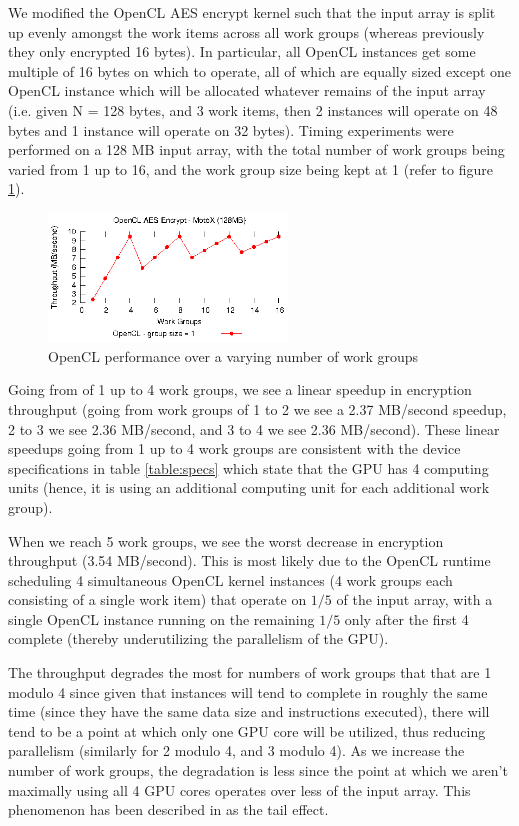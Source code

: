 \documentclass[conference,10pt]{IEEEtran}
\begin{document}
We modified the OpenCL AES encrypt kernel such that the input array is split up evenly amongst the 
work items across all work groups (whereas previously they only encrypted 16 bytes). In particular, 
all OpenCL instances get some multiple of 16 bytes on which to operate, all of which are equally 
sized except one OpenCL instance which will be allocated whatever remains of the input array (i.e. 
given N = 128 bytes, and 3 work items, then 2 instances will operate on 48 bytes and 1 instance will 
operate on 32 bytes). Timing experiments were performed on a 128 MB input array, with the total 
number of work groups being varied from 1 up to 16, and the work group size being kept at 1 (refer 
to figure \ref{fig:num_work_groups}).

\begin{figure}[!t]
\centering
\includegraphics[width=2.5in]{../final/motox/4.2/sample_opencl_aes_global_worksize.128MB.16_max_global_worksize.again.report.eps}
\caption{OpenCL performance over a varying number of work groups}
\label{fig:num_work_groups}
\end{figure}

Going from of 1 up to 4 work groups, we see a linear speedup in encryption throughput (going from 
work groups of 1 to 2 we see a 2.37 MB/second speedup, 2 to 3 we see 2.36 MB/second, and 3 to 4 we 
see 2.36 MB/second). These linear speedups going from 1 up to 4 work groups are consistent with the 
device specifications in table \ref{table:specs} which state that the GPU has 4 computing units 
(hence, it is using an additional computing unit for each additional work group).

When we reach 5 work groups, we see the worst decrease in encryption throughput (3.54 MB/second). 
This is most likely due to the OpenCL runtime scheduling 4 simultaneous OpenCL kernel instances (4 
work groups each consisting of a single work item) that operate on $1/5$ of the input array, with a 
single OpenCL instance running on the remaining $1/5$ only after the first 4 complete (thereby 
underutilizing the parallelism of the GPU).

The throughput degrades the most for numbers of work groups that that are 1 modulo 4 since given 
that instances will tend to complete in roughly the same time (since they have the same data size 
and instructions executed), there will tend to be a point at which only one GPU core will be 
utilized, thus reducing parallelism (similarly for 2 modulo 4, and 3 modulo 4). As we increase the 
number of work groups, the degradation is less since the point at which we aren't maximally using 
all 4 GPU cores operates over less of the input array.  This phenomenon has been described in 
\cite{gpu_opt} as the tail effect.
\end{document}
